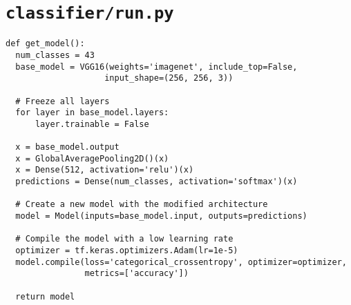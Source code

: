 \section*{\lstinline{classifier/run.py}}

\begin{code}
\begin{verbatim}
def get_model():
  num_classes = 43
  base_model = VGG16(weights='imagenet', include_top=False, 
                    input_shape=(256, 256, 3))

  # Freeze all layers
  for layer in base_model.layers:
      layer.trainable = False

  x = base_model.output
  x = GlobalAveragePooling2D()(x)
  x = Dense(512, activation='relu')(x)
  predictions = Dense(num_classes, activation='softmax')(x)

  # Create a new model with the modified architecture
  model = Model(inputs=base_model.input, outputs=predictions)

  # Compile the model with a low learning rate
  optimizer = tf.keras.optimizers.Adam(lr=1e-5)
  model.compile(loss='categorical_crossentropy', optimizer=optimizer, 
                metrics=['accuracy'])

  return model
\end{verbatim}
\label{lst:vgg16}
\end{code}


